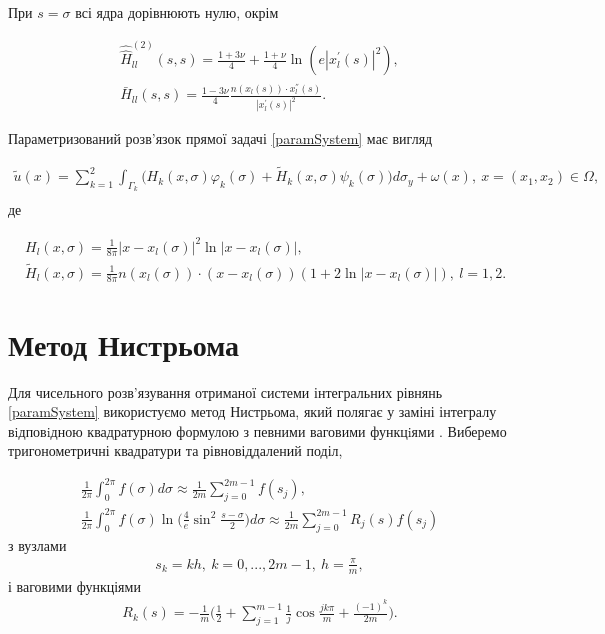 \documentclass[12pt]{report}
\begin{document}
 При $s=\sigma$ всі ядра дорівнюють нулю, окрім 
 
 \begin{gather*}
	\hat{\hat{H}}^{(2)}_{ll}(s, s) = \frac{1+3\nu}{4}+\frac{1+\nu}{4}\ln(e|x_l^{'}(s)|^2), \\
	\bar{H}_{ll}(s,s)=\frac{1-3\nu}{4}\frac{n(x_l(s))\cdot x_l^{''}(s)}{|x_l^{'}(s)|^2}.
 \end{gather*}
 
 Параметризований розв'язок прямої задачі \eqref{paramSystem} має вигляд
 
  \begin{equation}
 \begin{split}
	\tilde{u}(x)=\sum_{k=1}^{2}\int_{\Gamma_k}\bigg(H_{k}(x, \sigma)\varphi_k(\sigma)+\tilde{H}_{k}(x, \sigma)\psi_k(\sigma)\bigg)d\sigma_y+\omega(x), \ x=(x_1,x_2)\in\Omega,\\
\end{split}
 \end{equation}
 де
 
 \begin{equation*}
 \begin{split}
	&H_{l}(x, \sigma) = \frac{1}{8\pi}|x-x_l(\sigma)|^2\ln|x-x_l(\sigma)|,\\
	&\tilde{H}_{l}(x, \sigma) = \frac{1}{8\pi}n(x_l(\sigma))\cdot(x-x_l(\sigma))(1+2\ln|x-x_l(\sigma)|), \ l=1, 2.
\end{split}
 \end{equation*}
 
 
\section{Метод Нистрьома}

Для чисельного розв'язування отриманої системи інтегральних рівнянь \eqref{paramSystem} використуємо метод Нистрьома, який полягає у заміні інтегралу вiдповiдною квадратурною формулою з певними ваговими функцiями \cite{kress}. Виберемо тригонометричні квадратури та рівновіддалений поділ,

\begin{gather}
 	\frac{1}{2\pi}\int_{0}^{2\pi}f(\sigma)d\sigma\approx\frac{1}{2m}\sum_{j=0}^{2m-1}f(s_j), \\
	\frac{1}{2\pi}\int_{0}^{2\pi}f(\sigma)\ln\bigg(\frac{4}{e}\sin^2\frac{s-\sigma}{2}\bigg)d\sigma\approx\frac{1}{2m}\sum_{j=0}^{2m-1}R_j(s)f(s_j)
 \end{gather}
 з вузлами
 \begin{gather}
 	s_k=kh, \ k=0,...,2m-1, \ h=\frac{\pi}{m},
  \end{gather}
  і ваговими функціями
  \begin{gather}
 	R_k(s)=-\frac{1}{m}\bigg(\frac{1}{2}+\sum_{j=1}^{m-1}\frac{1}{j}\cos \frac{jk\pi}{m}+ \frac{(-1)^k}{2m}\bigg).
  \end{gather}
\end{document}
